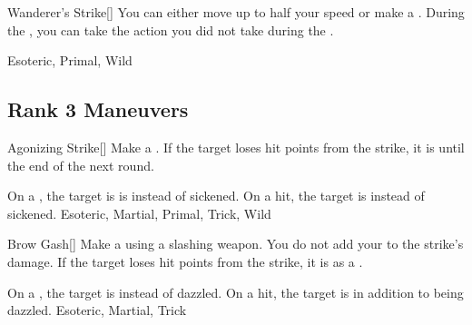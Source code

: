 \lowercase{\hypertarget{maneuver:Wanderer's Strike}{}}\label{maneuver:Wanderer's Strike}
\hypertarget{maneuver:Wanderer's Strike}{}
\begin{freeability}[Rank 2]{Wanderer's Strike}[]
You can either move up to half your speed or make a .
During the , you can take the action you did not take during the .


 Esoteric, Primal, Wild
\end{freeability}
\vspace{0.25em}


\subsection{Rank 3 Maneuvers}

\lowercase{\hypertarget{maneuver:Agonizing Strike}{}}\label{maneuver:Agonizing Strike}
\hypertarget{maneuver:Agonizing Strike}{}
\begin{freeability}[Rank 3]{Agonizing Strike}[]
Make a .
If the target loses hit points from the strike, it is  until the end of the next round.

\rankline
{} On a , the target is is  instead of sickened.
 On a hit, the target is  instead of sickened.
 Esoteric, Martial, Primal, Trick, Wild
\end{freeability}
\vspace{0.25em}



\lowercase{\hypertarget{maneuver:Brow Gash}{}}\label{maneuver:Brow Gash}
\hypertarget{maneuver:Brow Gash}{}
\begin{freeability}[Rank 3]{Brow Gash}[]
Make a  using a slashing weapon.
You do not add your  to the strike's damage.
If the target loses hit points from the strike, it is  as a .

\rankline
{} On a , the target is  instead of dazzled.
 On a hit, the target is  in addition to being dazzled.
 Esoteric, Martial, Trick
\end{freeability}
\vspace{0.25em}



